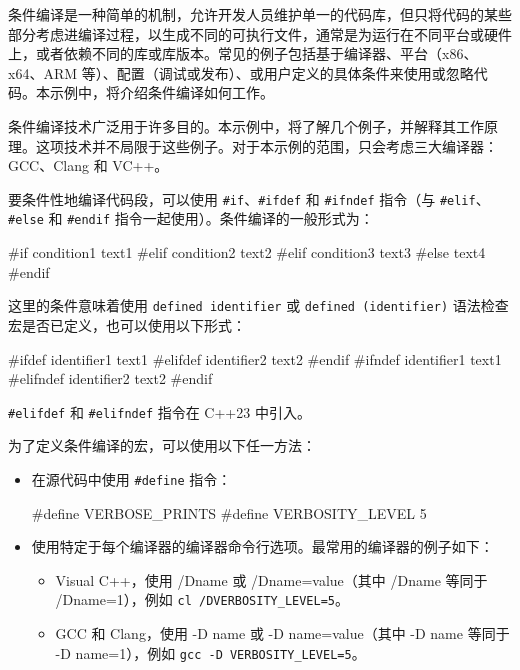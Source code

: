 
条件编译是一种简单的机制，允许开发人员维护单一的代码库，但只将代码的某些部分考虑进编译过程，以生成不同的可执行文件，通常是为运行在不同平台或硬件上，或者依赖不同的库或库版本。常见的例子包括基于编译器、平台（x86、x64、ARM 等）、配置（调试或发布）、或用户定义的具体条件来使用或忽略代码。本示例中，将介绍条件编译如何工作。


条件编译技术广泛用于许多目的。本示例中，将了解几个例子，并解释其工作原理。这项技术并不局限于这些例子。对于本示例的范围，只会考虑三大编译器：GCC、Clang 和 VC++。


要条件性地编译代码段，可以使用 \verb|#if|、\verb|#ifdef| 和 \verb|#ifndef| 指令（与 \verb|#elif|、\verb|#else| 和 \verb|#endif| 指令一起使用）。条件编译的一般形式为：

\begin{cpp}
#if condition1
    text1
#elif condition2
    text2
#elif condition3
    text3
#else
    text4
#endif
\end{cpp}

这里的条件意味着使用 \verb|defined identifier| 或 \verb|defined (identifier)| 语法检查宏是否已定义，也可以使用以下形式：

\begin{cpp}
#ifdef identifier1
    text1
#elifdef identifier2
    text2
#endif
#ifndef identifier1
    text1
#elifndef identifier2
    text2
#endif
\end{cpp}

\verb|#elifdef| 和 \verb|#elifndef| 指令在 C++23 中引入。

为了定义条件编译的宏，可以使用以下任一方法：

\begin{itemize}
\item
在源代码中使用 \verb|#define| 指令：

\begin{cpp}
#define VERBOSE_PRINTS
#define VERBOSITY_LEVEL 5
\end{cpp}

\item
使用特定于每个编译器的编译器命令行选项。最常用的编译器的例子如下：

\begin{itemize}
\item
Visual C++，使用 /Dname 或 /Dname=value（其中 /Dname 等同于 /Dname=1），例如 \verb|cl /DVERBOSITY_LEVEL=5|。

\item
GCC 和 Clang，使用 -D name 或 -D name=value（其中 -D name 等同于 -D name=1），例如 \verb|gcc -D VERBOSITY_LEVEL=5|。
\end{itemize}
\end{itemize}

